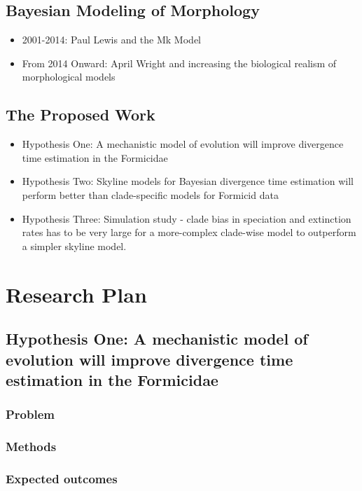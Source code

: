\documentclass[]{article}
\begin{document}
\subsection{Bayesian Modeling of Morphology}
\begin{itemize}
\item 2001-2014: Paul Lewis and the Mk Model
\item From 2014 Onward: April Wright and increasing the biological realism of morphological models
\end{itemize}	

\subsection{The Proposed Work}

\begin{itemize}
\item Hypothesis One: A mechanistic model of evolution will improve divergence time estimation in the Formicidae
\item Hypothesis Two: Skyline models for Bayesian divergence time estimation will perform better than clade-specific models for Formicid data
\item Hypothesis Three: Simulation study - clade bias in speciation and extinction rates has to be very large for a more-complex clade-wise model to outperform a simpler skyline model.
\end{itemize}
	
\section{Research Plan}

\subsection{Hypothesis One: A mechanistic model of evolution will improve divergence time estimation in the Formicidae}
\subsubsection{Problem}
\subsubsection{Methods}
\subsubsection{Expected outcomes}
\end{document}
